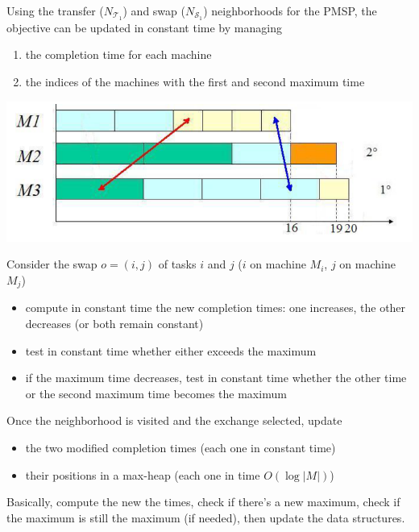 Using the transfer ($N_{\mathcal{T}_1}$) and swap ($N_{\mathcal{S}_1}$) neighborhoods for the PMSP, the objective can be updated in constant time by managing
\begin{enumerate}
	\item the completion time for each machine
	
	\item the indices of the machines with the first and second maximum time
\end{enumerate}

\begin{center}
	\includegraphics[width=0.75\columnwidth]{img/PMSP2}
\end{center}

Consider the swap $o = (i, j)$ of tasks $i$ and $j$ ($i$ on machine $M_i$, $j$ on machine $M_j$)
\begin{itemize}
	\item compute in constant time the new completion times: one increases, the other decreases (or both remain constant)
	
	\item test in constant time whether either exceeds the maximum
	
	\item if the maximum time decreases, test in constant time whether the other time or the second maximum time becomes the maximum
\end{itemize}

Once the neighborhood is visited and the exchange selected, update
\begin{itemize}
	\item the two modified completion times (each one in constant time)
	
	\item their positions in a max-heap (each one in time $O (\log |M|)$)
\end{itemize}
\nn	

Basically, compute the new the times, check if there's a new maximum, check if the maximum is still the maximum (if needed), then update the data structures. \\

